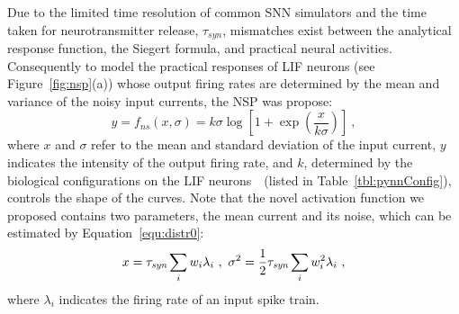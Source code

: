 %	
	Due to the limited time resolution of common SNN simulators and the time taken for neurotransmitter release, $\tau_{syn}$, mismatches exist between the analytical response function, the Siegert formula, and practical neural activities.
	Consequently to model the practical responses of LIF neurons (see Figure~\ref{fig:nsp}(a)) whose output firing rates are determined by the mean and variance of the noisy input currents, the NSP was propose:
	\begin{equation}
	y = f_{ns}(x, \sigma) = k \sigma \log [1 + \exp(\frac{x}{k \sigma})]~,
	\label{equ:nsp}
	\end{equation}
	where $x$ and $\sigma$ refer to the mean and standard deviation of the input current, $y$ indicates the intensity of the output firing rate, and $k$, determined by the biological configurations on the LIF neurons~\cite{liu2016noisy}~(listed in Table~\ref{tbl:pynnConfig}), controls the shape of the curves.
	Note that the novel activation function we proposed contains two parameters, the mean current and its noise, which can be estimated by Equation~\ref{equ:distr0}:
	\begin{equation}
	x = \tau_{\textit{\textrm{syn}}}\sum_i w_i\lambda_{i}~, ~\sigma^2=\frac{1}{2}\tau_{\textit{\textrm{syn}}}\sum_i w_i^2\lambda_{i}~,
	\label{equ:distr}
	\end{equation}
	where $\lambda_i$ indicates the firing rate of an input spike train.
